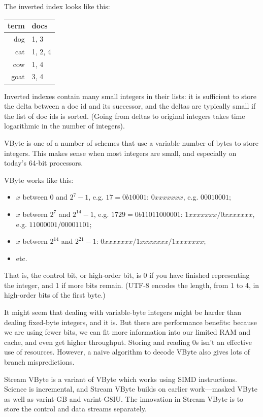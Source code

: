 \documentclass[a4paper]{report}
\begin{document}
The inverted index looks like this:
\begin{center}
\begin{tabular}{r|l}
term & docs \\ \hline
dog & 1, 3 \\
cat & 1, 2, 4 \\
cow & 1, 4 \\
goat & 3, 4
\end{tabular}
\end{center}

Inverted indexes contain many small integers in their lists: it is
sufficient to store the delta between a doc id and its successor, and
the deltas are typically small if the list of doc ids is sorted.
(Going from deltas to original integers takes time logarithmic
in the number of integers).

VByte is one of a number of schemes that use a variable number of
bytes to store integers.  This makes sense when most integers are
small, and especially on today's 64-bit processors.

VByte works like this:
\vspace*{-1em}
\begin{itemize}[noitemsep]
\item $x$ between 0 and $2^7-1$, e.g. $17 = 0b10001$: $0xxx xxxx$, e.g. $0001 0001$;
\item $x$ between $2^7$ and $2^{14}-1$, e.g. $1729 = 0b110 11000001$:
                   $1xxx xxxx/0xxx xxxx$, e.g. $1100 0001/0000 1101$;
\item $x$ between $2^{14}$ and $2^{21}-1$: $0xxx xxxx/1xxx xxxx/1xxx xxxx$;
\item etc.
\end{itemize}
That is, the control bit, or high-order bit, is 0 if you have finished representing the integer,
and 1 if more bits remain. (UTF-8 encodes the length, from 1 to 4, in high-order bits of the first byte.)

It might seem that dealing with variable-byte integers might be
harder than dealing fixed-byte integers, and it is. But there are performance benefits: because we are
using fewer bits, we can fit more information into our limited RAM and
cache, and even get higher throughput. Storing and reading 0s isn't an effective
use of resources. However, a naive algorithm to decode VByte also gives
lots of branch mispredictions.

Stream VByte is a variant of VByte which works using SIMD instructions.
Science is incremental, and Stream VByte builds on earlier work---masked VByte
as well as {\sc varint}-GB and {\sc varint}-G8IU. The innovation in
Stream VByte is to store the control and data streams separately.
\end{document}
